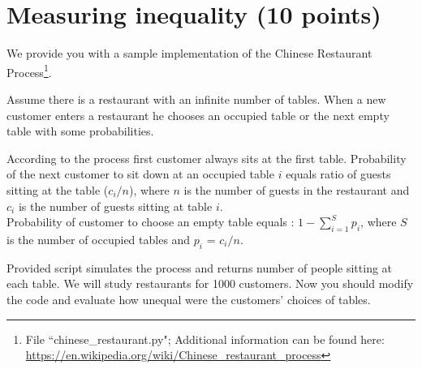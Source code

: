 \documentclass{WeSTassignment}
\begin{document}


\section{Measuring inequality (10 points)}

We provide you with a sample implementation of the Chinese Restaurant Process\footnote{File ``chinese\_restaurant.py"; Additional information can be found here: \url{https://en.wikipedia.org/wiki/Chinese_restaurant_process}}.

Assume there is a restaurant with an infinite number of tables. 
When a new customer enters a restaurant he chooses an occupied table or the next empty table with some probabilities.


According to the process first customer always sits at the first table. 
Probability of the next customer to sit down at an occupied table $i$ equals 
 ratio of guests sitting at the table ($c_i/n$), where $n$ is the number of guests in the restaurant and $c_i$ is the number of guests sitting at table $i$.\\
 Probability of customer to choose an empty table equals :  $1- \sum_{i=1}^{S}{p_i}$, where $S$ is the number of occupied tables and ${p_i}$ = $c_i/n$.
 
Provided script simulates the process and returns number of people sitting at each table. We will study restaurants for 1000 customers.
Now you should modify the code and evaluate how unequal were the customers' choices of tables.   


\end{document}
